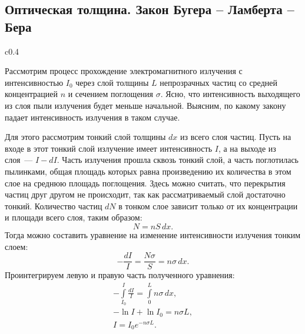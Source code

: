 \subsection{Оптическая толщина. Закон Бугера -- Ламберта -- Бера}
\begin{wrapfigure}[10]{c}{0.4\tw}
	\centering
	\caption{}
	\label{}
\end{wrapfigure}
Рассмотрим процесс прохождение электромагнитного излучения с интенсивностью $I_0$ через слой толщины $L$ непрозрачных частиц со средней концентрацией $n$ и сечением поглощения $\sigma$. Ясно, что интенсивность выходящего из слоя пыли излучения будет меньше начальной. Выясним, по какому закону падает интенсивность излучения в таком случае.

Для этого рассмотрим тонкий слой толщины $dx$ из всего слоя частиц. Пусть на входе в этот тонкий слой излучение имеет интенсивность $I$, а на выходе из слоя~--- $I - dI$. Часть излучения прошла сквозь тонкий слой, а часть поглотилась пылинками, общая площадь которых равна произведению их количества в этом слое на среднюю площадь поглощения. Здесь можно считать, что перекрытия частиц друг другом не происходит, так как рассматриваемый слой достаточно тонкий. Количество частиц  $dN$ в тонком слое зависит только от их концентрации и площади всего слоя, таким образом:
\begin{equation*}
	N = n S \, dx.
\end{equation*}
Тогда можно составить уравнение на изменение интенсивности излучения тонким слоем:
\begin{equation*}
	-\frac{dI}{I} = \frac{N\sigma}{S} = n\sigma \, dx.
\end{equation*}
Проинтегрируем левую и правую часть полученного уравнения:
\begin{gather*}
	-\int\limits_{I_0}^{I} \frac{dI}{I} = \int\limits_{0}^{L} n \sigma \, dx,\\
	-\ln I + \ln I_0 = n\sigma L,\\[.5pc]
	I = I_0 e^{-n\sigma L}. \tag{\theequation}
\end{gather*}

